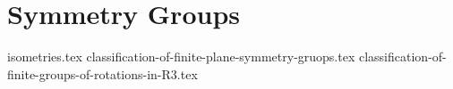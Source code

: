 \chapter{Symmetry Groups}
{isometries.tex}
{classification-of-finite-plane-symmetry-gruops.tex}
{classification-of-finite-groups-of-rotations-in-R3.tex}
